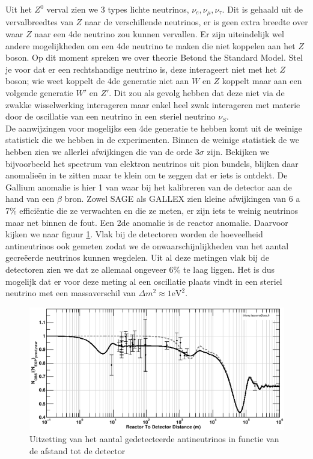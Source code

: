 \documentclass[../main.tex]{subfiles}
\begin{document}
Uit het $Z^0$ verval zien we 3 types lichte neutrinos, $\nu_e,\nu_\mu,\nu_\tau$. Dit is gehaald uit de vervalbreedtes van $Z$ naar de verschillende neutrinos, er is geen extra breedte over waar $Z$ naar een 4de neutrino zou kunnen vervallen. Er zijn uiteindelijk wel andere mogelijkheden om een 4de neutrino te maken die niet koppelen aan het $Z$ boson. Op dit moment spreken we over theorie Betond the Standard Model. Stel je voor dat er een rechtshandige neutrino is, deze interageert niet met het $Z$ boson; wie weet koppelt de 4de generatie niet aan $W$ en $Z$ koppelt maar aan een volgende generatie $W'$ en $Z'$. Dit zou als gevolg hebben dat deze niet via de zwakke wisselwerking interageren maar enkel heel zwak interageren met materie door de oscillatie van een neutrino in een steriel neutrino $\nu_S$.\\
De aanwijzingen voor mogelijks een 4de generatie te hebben komt uit de weinige statistiek die we hebben in de experimenten. Binnen de weinige statistiek de we hebben zien we allerlei afwijkingen die van de orde $3\sigma$ zijn. Bekijken we bijvoorbeeld het spectrum van elektron neutrinos uit pion bundels, blijken daar anomalieën in te zitten maar te klein om te zeggen dat er iets is ontdekt. De Gallium anomalie is hier 1 van waar bij het kalibreren van de detector aan de hand van een $\beta$ bron. Zowel SAGE als GALLEX zien kleine afwijkingen van 6 a 7\% efficiëntie die ze verwachten en die ze meten, er zijn iets te weinig neutrinos maar net binnen de fout. Een 2de anomalie is de reactor anomalie. Daarvoor kijken we naar figuur \ref{fig:neutrinos/reactor_anomalie}. Vlak bij de detectoren worden de hoeveelheid antineutrinos ook gemeten zodat we de onwaarschijnlijkheden van het aantal gecreëerde neutrinos kunnen wegdelen. Uit al deze metingen vlak bij de detectoren zien we dat ze allemaal ongeveer 6\% te laag liggen. Het is dus mogelijk dat er voor deze meting al een oscillatie plaats vindt in een steriel neutrino met een massaverschil van $\Delta m^2\approx 1\text{eV}^2$.

\begin{figure}[h]
    \centering
    \includegraphics[width=0.7\linewidth]{neutrinos/reactor_anomalie.png}
    \caption{Uitzetting van het aantal gedetecteerde antineutrinos in functie van de afstand tot de detector}%
    \label{fig:neutrinos/reactor_anomalie}
\end{figure}
\end{document}
